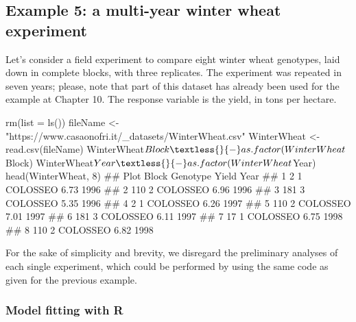 \documentclass[a4paper,12pt,oneside]{book}
\newenvironment{Shaded}{\begin{snugshade}}{\end{snugshade}}
\newcommand{\DecValTok}[1]{#1}
\newcommand{\SpecialCharTok}[1]{#1}
\newcommand{\StringTok}[1]{#1}
\newcommand{\DocumentationTok}[1]{#1}
\newcommand{\OtherTok}[1]{#1}
\newcommand{\FunctionTok}[1]{#1}
\newcommand{\AttributeTok}[1]{#1}
\newcommand{\NormalTok}[1]{#1}
\begin{document}
\hypertarget{example-5-a-multi-year-winter-wheat-experiment}{%
\subsection{Example 5: a multi-year winter wheat experiment}\label{example-5-a-multi-year-winter-wheat-experiment}}

Let's consider a field experiment to compare eight winter wheat genotypes, laid down in complete blocks, with three replicates. The experiment was repeated in seven years; please, note that part of this dataset has already been used for the example at Chapter 10. The response variable is the yield, in tons per hectare.

\begin{Shaded}
\begin{Highlighting}[]
\FunctionTok{rm}\NormalTok{(}\AttributeTok{list =} \FunctionTok{ls}\NormalTok{())}
\NormalTok{fileName }\OtherTok{\textless{}{-}} \StringTok{"https://www.casaonofri.it/\_datasets/WinterWheat.csv"}
\NormalTok{WinterWheat }\OtherTok{\textless{}{-}} \FunctionTok{read.csv}\NormalTok{(fileName)}
\NormalTok{WinterWheat}\SpecialCharTok{$}\NormalTok{Block }\OtherTok{\textless{}{-}} \FunctionTok{as.factor}\NormalTok{(WinterWheat}\SpecialCharTok{$}\NormalTok{Block)}
\NormalTok{WinterWheat}\SpecialCharTok{$}\NormalTok{Year }\OtherTok{\textless{}{-}} \FunctionTok{as.factor}\NormalTok{(WinterWheat}\SpecialCharTok{$}\NormalTok{Year)}
\FunctionTok{head}\NormalTok{(WinterWheat, }\DecValTok{8}\NormalTok{)}
\DocumentationTok{\#\#   Plot Block Genotype Yield Year}
\DocumentationTok{\#\# 1    2     1 COLOSSEO  6.73 1996}
\DocumentationTok{\#\# 2  110     2 COLOSSEO  6.96 1996}
\DocumentationTok{\#\# 3  181     3 COLOSSEO  5.35 1996}
\DocumentationTok{\#\# 4    2     1 COLOSSEO  6.26 1997}
\DocumentationTok{\#\# 5  110     2 COLOSSEO  7.01 1997}
\DocumentationTok{\#\# 6  181     3 COLOSSEO  6.11 1997}
\DocumentationTok{\#\# 7   17     1 COLOSSEO  6.75 1998}
\DocumentationTok{\#\# 8  110     2 COLOSSEO  6.82 1998}
\end{Highlighting}
\end{Shaded}

For the sake of simplicity and brevity, we disregard the preliminary analyses of each single experiment, which could be performed by using the same code as given for the previous example.

\hypertarget{model-fitting-with-r-6}{%
\subsubsection{Model fitting with R}\label{model-fitting-with-r-6}}
\end{document}
